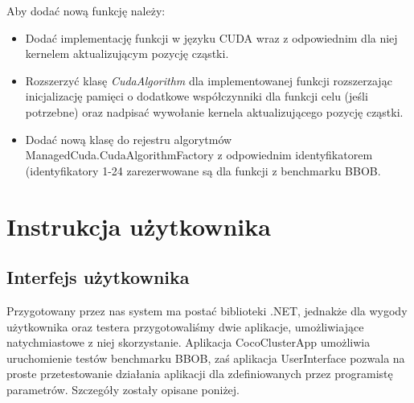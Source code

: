 \documentclass[12pt, twoside, openany, abstract=on]{report}
\theoremstyle{definition}
\begin{document}
Aby dodać nową funkcję należy:
\begin{itemize}
\item Dodać implementację funkcji w języku CUDA wraz z odpowiednim dla niej kernelem aktualizującym pozycję cząstki.
\item Rozszerzyć klasę \textit{CudaAlgorithm} dla implementowanej funkcji rozszerzając inicjalizację pamięci o dodatkowe współczynniki dla funkcji celu (jeśli potrzebne) oraz nadpisać wywołanie kernela aktualizującego pozycję cząstki.
\item Dodać nową klasę do rejestru algorytmów ManagedCuda.CudaAlgorithmFactory z odpowiednim identyfikatorem (identyfikatory 1-24 zarezerwowane są dla funkcji z benchmarku BBOB.
\end{itemize}
 
 

\chapter{Instrukcja użytkownika}

\section{Interfejs użytkownika}
Przygotowany przez nas system ma postać biblioteki .NET, jednakże dla wygody użytkownika oraz testera przygotowaliśmy dwie aplikacje, umożliwiające natychmiastowe z niej skorzystanie. Aplikacja CocoClusterApp umożliwia uruchomienie testów benchmarku BBOB, zaś aplikacja UserInterface pozwala na proste przetestowanie działania aplikacji dla zdefiniowanych przez programistę parametrów. Szczegóły zostały opisane poniżej.
\end{document}
